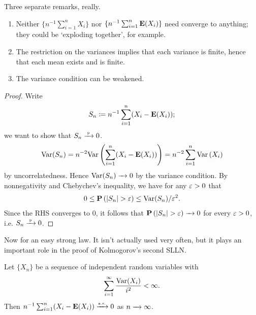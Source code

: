 \documentclass[11pt,letterpaper,reqno,oneside]{article}
\begin{document}
\begin{remark}
	Three separate remarks, really.
	\begin{enumerate}

		\item Neither $\{ n^{-1} \sum_{i=1}^n X_i \}$ nor $\{ n^{-1} \sum_{i=1}^n \E(X_i) \}$ need converge to anything; they could be `exploding together', for example.

		\item The restriction on the variances implies that each variance is finite, hence that each mean exists and is finite.

		\item The variance condition can be weakened.

	\end{enumerate}
\end{remark}


\begin{proof}
	Write
	\begin{equation*}
		S_n \coloneqq n^{-1} \sum_{i=1}^n (X_i-\E(X_i)) ;
	\end{equation*}
	we want to show that $S_n \convp 0$.
	\begin{equation*}
		\Var(S_n)
		= n^{-2} \Var\left( \sum_{i=1}^n (X_i-\E(X_i)) \right)
		= n^{-2} \sum_{i=1}^n \Var\left( X_i \right)
	\end{equation*}
	by uncorrelatedness. Hence $\Var(S_n) \conv 0$ by the variance condition. By nonnegativity and Chebychev's inequality, we have for any $\eps>0$ that
	\begin{align*}
		0
		\leq \PP\left( \abs*{S_n} > \eps \right)
		\leq \Var(S_n) / \eps^2 .
	\end{align*}
	Since the RHS converges to $0$, it follows that $\PP\left( \abs*{S_n} > \eps \right) \conv 0$ for every $\eps>0$, i.e. $S_n \convp 0$.
\end{proof}



Now for an easy strong law. It isn't actually used very often, but it plays an important role in the proof of Kolmogorov's second SLLN.
%
\begin{theorem}
	\label{theorem:Kolmogorov_1st_SLLN}
	Let $\{ X_n \}$ be a sequence of independent random variables with
	\begin{equation*}
		\sum_{i=1}^\infty \frac{ \Var(X_i) }{i^2} < \infty .
	\end{equation*}
	Then $n^{-1} \sum_{i=1}^n (X_i-\E(X_i)) \convas 0$ as $n\conv\infty$.
\end{theorem}
\end{document}
